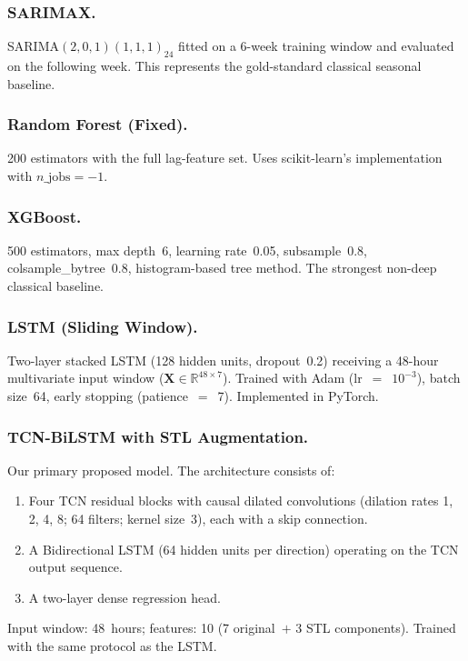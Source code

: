 \documentclass[runningheads]{llncs}
\begin{document}
\subsubsection{SARIMAX.}
SARIMA$(2,0,1)(1,1,1)_{24}$ fitted on a 6-week training window and
evaluated on the following week. This represents the gold-standard
classical seasonal baseline.

\subsubsection{Random Forest (Fixed).}
200 estimators with the full lag-feature set. Uses scikit-learn's
implementation with $n\_\text{jobs}=-1$.

\subsubsection{XGBoost.}
500 estimators, max depth~6, learning rate~0.05, subsample~0.8,
colsample\_bytree~0.8, histogram-based tree method. The strongest
non-deep classical baseline.

\subsubsection{LSTM (Sliding Window).}
Two-layer stacked LSTM (128 hidden units, dropout~0.2) receiving a
48-hour multivariate input window ($\mathbf{X} \in \mathbb{R}^{48 \times 7}$).
Trained with Adam (lr~$=$~$10^{-3}$), batch size~64, early stopping
(patience~$=$~7). Implemented in PyTorch.

\subsubsection{TCN-BiLSTM with STL Augmentation.}
Our primary proposed model. The architecture consists of:
\begin{enumerate}
  \item Four TCN residual blocks with causal dilated convolutions
        (dilation rates 1, 2, 4, 8; 64 filters; kernel size~3), each
        with a skip connection.
  \item A Bidirectional LSTM (64 hidden units per direction) operating
        on the TCN output sequence.
  \item A two-layer dense regression head.
\end{enumerate}
Input window: 48~hours; features: 10 (7 original~$+$ 3 STL components).
Trained with the same protocol as the LSTM.
\end{document}
